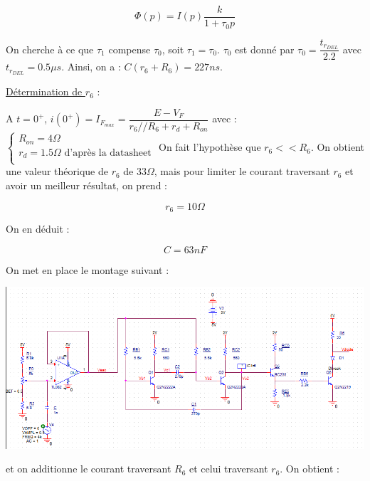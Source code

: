 \documentclass[a4paper]{report}
\begin{document}
$$\Phi(p) =I(p) \dfrac{k}{1+\tau_0p}$$

On cherche  à ce que $\tau_1$ compense $\tau_0$, soit $\tau_1 = \tau_0$.
$\tau_0$ est donné par $\tau_0 = \dfrac{t_{r_{DEL}}}{2.2}$ avec $t_{r_{DEL}} = 0.5\mu s$.
Ainsi, on a : $C(r_6+R_6) = 227ns$.\newline

\underline{Détermination de $r_6$} :\newline

A $t = 0^+$, $i(0^+) = I_{F_{max}} = \dfrac{E-V_F}{r_6//R_6 + r_d + R_{on}}$ avec :\newline
\newline
$\left\{
\begin{array}{l}
  R_{on} = 4\Omega\\
  r_d = 1.5\Omega \mbox{    d'après la datasheet}\\
\end{array}
\right.$
\newline
\newline
On fait l'hypothèse que $r_6<<R_6$. On obtient une valeur théorique de $r_6$ de $33\Omega$, mais pour limiter le courant traversant $r_6$ et avoir un meilleur résultat, on prend :

$$r_6 = 10\Omega$$

On en déduit :

$$C = 63nF$$

On met en place le montage suivant :

\begin{center}
\includegraphics[width=1\textwidth]{Montage_DEL.PNG}
\end{center}

et on additionne le courant traversant $R_6$ et celui traversant $r_6$. On obtient :
\end{document}
